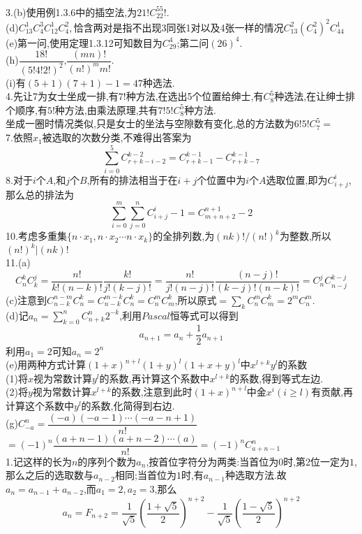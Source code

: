 \documentclass[b5paper]{ctexart}
\begin{document}
\pagestyle{plain}
\noindent
\\
3.(b)使用例1.3.6中的插空法,为$21!C_{22}^55!.$\\
(d)$C_{13}^1C_4^3C_{12}^1C_4^2,$恰含两对是指不出现3同张1对以及4张一样的情况$C_{13}^2(C_4^2)^2C_{44}^1$\\
(e)第一问,使用定理1.3.12可知数目为$C_{29}^4$;第二问$(26)^4.$\\
(h)$\dfrac{18!}{(5!4!2!)^2}$,$\dfrac{(mn)!}{(n!)^mm!}$.\\
(i)有$(5+1)(7+1)-1=47$种选法.\\
4.先让7为女士坐成一排,有$7!$种方法,在选出5个位置给绅士,有$C_8^5$种选法,在让绅士排个顺序,有$5!$种方法,由乘法原理,共有$7!5!C_8^5$种方法.\\
坐成一圈时情况类似,只是女士的坐法与空隙数有变化,总的方法数为$6!5!C_7^5=$\\
7.依照$x_1$被选取的次数分类,不难得出答案为
\[\sum_{i=0}^5C_{r+k-i-2}^{k-2}=C_{r+k-1}^{k-1}-C_{r+k-7}^{k-1}\]
8.对于$i$个$A$,和$j$个$B$,所有的排法相当于在$i+j$个位置中为$i$个$A$选取位置,即为$C_{i+j}^i$,那么总的排法为
\[\sum_{i=0}^m\sum_{j=0}^nC_{i+j}^i-1=C_{m+n+2}^{n+1}-2\]
10.考虑多重集$\{n\cdot x_1,n\cdot x_2\cdots n\cdot x_k\}$的全排列数,为$(nk)!/(n!)^k$为整数,所以$(n!)^k|(nk)!$\\
11.(a)
\[C_n^kC_k^j=\dfrac{n!}{k!(n-k)!}\dfrac{k!}{j!(k-j)!}=\dfrac{n!}{j!(n-j)!}\dfrac{(n-j)!}{(k-j)!(n-k)!}=C_n^jC_{n-j}^{k-j}\]
(c)注意到$C_{n-k}^{n-m}C_n^k=C_{n-k}^{m-k}C_n^k=C_n^mC_m^k$,所以原式$=\sum\limits_kC_n^mC_m^k=2^mC_n^m.$\\
(d)记$a_n=\sum\limits_{k=0}^nC_{n+k}^n2^{-k}$,利用$Pascal$恒等式可以得到
\[a_{n+1}=a_n+\dfrac{1}{2}a_{n+1}\]
利用$a_1=2$可知$a_n=2^n$\\
(e)用两种方式计算$(1+x)^{n+l}(1+y)^l(1+x+y)^l$中$x^{l+k}y^l$的系数\\
(1)将$x$视为常数计算$y^l$的系数,再计算这个系数中$x^{l+k}$的系数,得到等式左边.\\
(2)将$y$视为常数计算$x^{l+k}$的系数,注意到此时$(1+x)^{n+l}$中金$x^i(i\geq l)$有贡献,再计算这个系数中$y^l$的系数,化简得到右边.\\
(g)$C_{-a}^n=\dfrac{(-a)(-a-1)\cdots(-a-n+1)}{n!}$\\
$=(-1)^n\dfrac{(a+n-1)(a+n-2)\cdots (a)}{n!}=(-1)^nC_{a+n-1}^n$\\
1.记这样的长为$n$的序列个数为$a_n$,按首位字符分为两类:当首位为$0$时,第2位一定为$1$,那么之后的选取数与$a_{n-2}$相同;当首位为$1$时,有$a_{n-1}$种选取方法.故$a_n=a_{n-1}+a_{n-2}$,而$a_1=2,a_2=3$,那么
\[a_n=F_{n+2}=\dfrac{1}{\sqrt{5}}\left( \dfrac{1+\sqrt{5}}{2}\right)^{n+2}-\dfrac{1}{\sqrt{5}}\left( \dfrac{1-\sqrt{5}}{2}\right)^{n+2} \]
\end{document}
